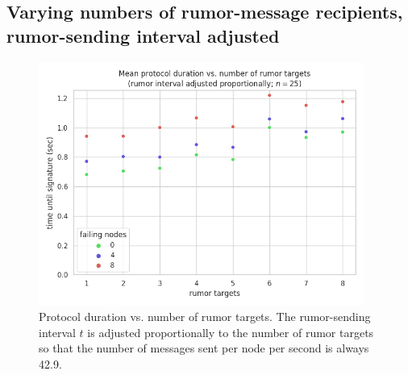 \subsection*{Varying numbers of rumor-message recipients, rumor-sending interval adjusted}

\begin{figure}[H]
    \centering
    \includegraphics[width=0.95\textwidth]{figures/9/round_wall_sum_by_rumor_targets.png}
    \captionsetup{labelformat=empty}
    \caption{Protocol duration vs. number of rumor targets. The rumor-sending interval $t$ is adjusted proportionally to the number of rumor targets so that the number of messages sent per node per second is always 42.9.}
\end{figure}


